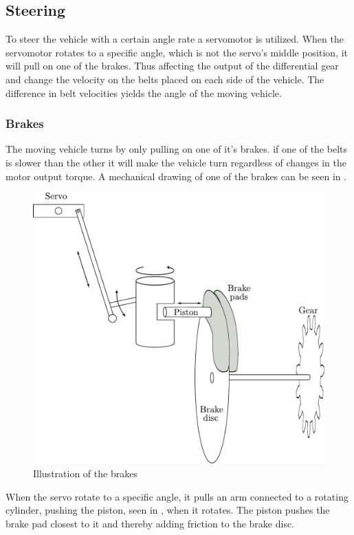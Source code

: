 \subsection{Steering}
To steer the vehicle with a certain angle rate a servomotor is utilized. When the servomotor rotates to a specific angle, which is not the servo's middle position, it will pull on one of the brakes. Thus affecting the output of the differential gear and change the velocity on the belts placed on each side of the vehicle. The difference in belt velocities yields the angle of the moving vehicle.

\subsubsection{Brakes}
The moving vehicle turns by only pulling on one of it's brakes. if one of the belts is slower than the other it will make the vehicle turn regardless of changes in the motor output torque. A mechanical drawing of one of the brakes can be seen in . 

 \begin{figure}[H]
	\centering
	\includegraphics[scale=0.6]{figures/brakeDescription.pdf}
	\caption{Illustration of the brakes}
	\label{Brakes}
\end{figure}

When the servo rotate to a specific angle, it pulls an arm connected to a rotating cylinder, pushing the piston, seen in , when it rotates. The piston pushes the brake pad closest to it and thereby adding friction to the brake disc.

